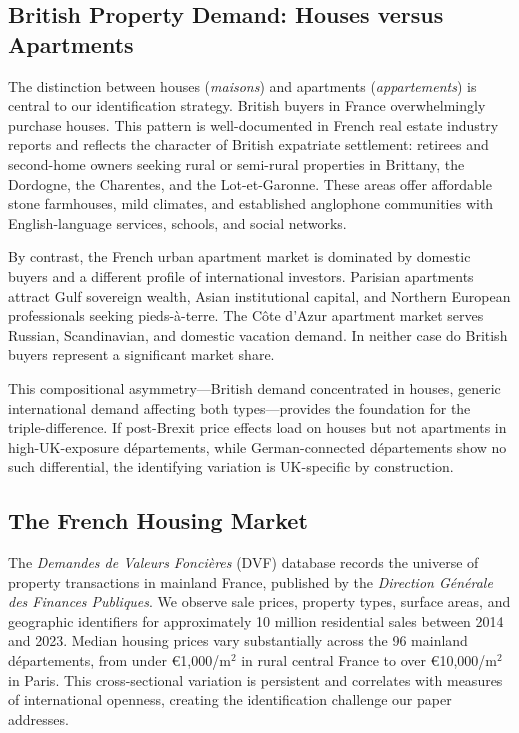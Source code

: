 \documentclass[12pt]{article}
\renewcommand{\EUR}[1]{\euro{}#1}
\begin{document}
\subsection{British Property Demand: Houses versus Apartments}

The distinction between houses (\textit{maisons}) and apartments (\textit{appartements}) is central to our identification strategy. British buyers in France overwhelmingly purchase houses. This pattern is well-documented in French real estate industry reports and reflects the character of British expatriate settlement: retirees and second-home owners seeking rural or semi-rural properties in Brittany, the Dordogne, the Charentes, and the Lot-et-Garonne. These areas offer affordable stone farmhouses, mild climates, and established anglophone communities with English-language services, schools, and social networks.

By contrast, the French urban apartment market is dominated by domestic buyers and a different profile of international investors. Parisian apartments attract Gulf sovereign wealth, Asian institutional capital, and Northern European professionals seeking pieds-\`a-terre. The C\^ote d'Azur apartment market serves Russian, Scandinavian, and domestic vacation demand. In neither case do British buyers represent a significant market share.

This compositional asymmetry---British demand concentrated in houses, generic international demand affecting both types---provides the foundation for the triple-difference. If post-Brexit price effects load on houses but not apartments in high-UK-exposure d\'epartements, while German-connected d\'epartements show no such differential, the identifying variation is UK-specific by construction.

\subsection{The French Housing Market}

The \textit{Demandes de Valeurs Fonci\`eres} (DVF) database records the universe of property transactions in mainland France, published by the \textit{Direction G\'en\'erale des Finances Publiques}. We observe sale prices, property types, surface areas, and geographic identifiers for approximately 10 million residential sales between 2014 and 2023. Median housing prices vary substantially across the 96 mainland d\'epartements, from under \EUR{1,000}/m$^2$ in rural central France to over \EUR{10,000}/m$^2$ in Paris. This cross-sectional variation is persistent and correlates with measures of international openness, creating the identification challenge our paper addresses.
\end{document}
